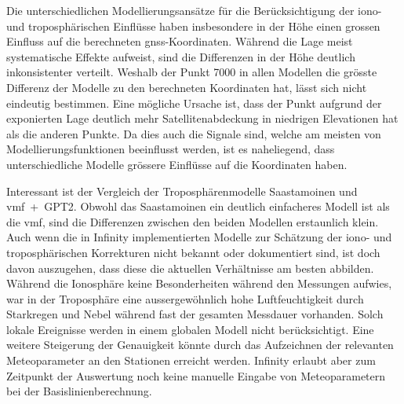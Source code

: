 Die unterschiedlichen Modellierungsansätze für die Berücksichtigung der iono- und troposphärischen Einflüsse haben 
insbesondere in der Höhe einen grossen Einfluss auf die berechneten \acrshort{gnss}-Koordinaten. Während die Lage meist 
systematische Effekte aufweist, sind die Differenzen in der Höhe deutlich inkonsistenter verteilt. Weshalb der Punkt 
7000 in allen Modellen die grösste Differenz der Modelle zu den berechneten Koordinaten hat, lässt sich nicht 
eindeutig bestimmen. Eine mögliche Ursache ist, dass der Punkt aufgrund der exponierten Lage deutlich mehr 
Satellitenabdeckung in niedrigen Elevationen hat als die anderen Punkte. Da dies auch die Signale sind, welche am 
meisten von Modellierungsfunktionen beeinflusst werden, ist es naheliegend, dass unterschiedliche Modelle 
grössere Einflüsse auf die Koordinaten haben.

Interessant ist der Vergleich der Troposphärenmodelle Saastamoinen und \gls{vmf}~+~GPT2. Obwohl das Saastamoinen ein 
deutlich einfacheres Modell ist als die \gls{vmf}, sind die Differenzen zwischen den beiden Modellen erstaunlich klein. 
Auch wenn die in Infinity implementierten Modelle zur Schätzung der iono- und troposphärischen Korrekturen 
nicht bekannt oder dokumentiert sind, ist doch davon auszugehen, dass diese die aktuellen Verhältnisse am besten 
abbilden. Während die Ionosphäre keine Besonderheiten während den Messungen aufwies, war in der Troposphäre 
eine aussergewöhnlich hohe Luftfeuchtigkeit durch Starkregen und Nebel während fast der gesamten Messdauer vorhanden. 
Solch lokale Ereignisse werden in einem globalen Modell nicht berücksichtigt. Eine weitere Steigerung der Genauigkeit 
könnte durch das Aufzeichnen der relevanten Meteoparameter an den Stationen erreicht werden. Infinity erlaubt 
aber zum Zeitpunkt der Auswertung noch keine manuelle Eingabe von Meteoparametern bei der Basislinienberechnung. 

